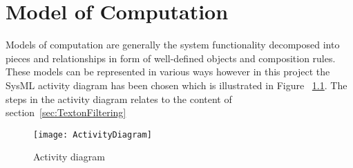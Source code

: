 \chapter{Model of Computation}

Models of computation are generally the system functionality decomposed into pieces and relationships in form of well-defined objects and composition rules. These models can be represented in various ways however in this project the SysML activity diagram has been chosen which is illustrated in Figure ~\ref{fig:ActivityDiagram}. The steps in the activity diagram relates to the content of section~\ref{sec:TextonFiltering}


\begin{figure}[H]
\centering
\texttt{[image: ActivityDiagram]}
\caption{Activity diagram}
\label{fig:ActivityDiagram}
\end{figure}